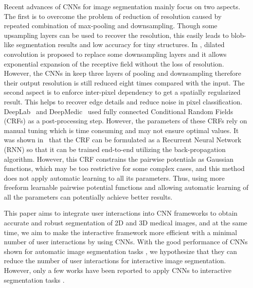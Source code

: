 \documentclass[10pt,journal,compsoc]{IEEEtran}
\begin{document}
Recent advances of CNNs for image segmentation mainly focus on two aspects. The first is to overcome the problem of reduction of resolution caused by repeated combination of max-pooling and downsampling. %
 Though some upsampling layers can be used to recover the resolution, this easily leads to blob-like segmentation results and low accuracy for tiny structures\cite{Long2014}. In \cite{Onvolutions2016, Chen2015iclr}, dilated convolution is proposed to replace some downsampling layers and it allows exponential expansion of the receptive field without the loss of resolution. However, the CNNs in \cite{Onvolutions2016,Chen2015iclr} keep three layers of pooling and downsampling therefore their output resolution is still reduced eight times compared with the input. The second aspect is to enforce inter-pixel dependency to get a spatially regularized result. %
 This helps to recover edge details and reduce noise in pixel classification. DeepLab~\cite{Chen2016deeplab} and DeepMedic~\cite{Kamnitsas2017} used fully connected Conditional Random Fields (CRFs) as a post-processing step. However, the parameters of these CRFs rely on manual tuning which is time consuming and may not ensure optimal values. It was shown in~\cite{Zheng2015a} that the CRF can be formulated as a Recurrent Neural Network (RNN) so that it can be trained end-to-end utilizing the back-propagation algorithm. However, this CRF constrains the pairwise potentials as Gaussian functions, which may be too restrictive for some complex cases, and this method does not apply automatic learning to all its parameters. Thus, using more freeform learnable pairwise potential functions and allowing automatic learning of all the parameters can potentially achieve better results.  

This paper aims to integrate user interactions into CNN frameworks to obtain accurate and robust segmentation of 2D and 3D medical images, and at the same time, we aim to make the interactive framework more efficient with a minimal number of user interactions by using CNNs. With the good performance of CNNs shown for automatic image segmentation tasks \cite{Girshick2014, Long2014, Chen2016deeplab, Havaei2016, Kamnitsas2017}, we hypothesize that they can reduce the number of user interactions for interactive image segmentation. However, only a few works have been reported to apply CNNs to interactive segmentation tasks \cite{Abdulkadir2016,Lin2016,Rajchl2016,Xu2016}. 
\end{document}
